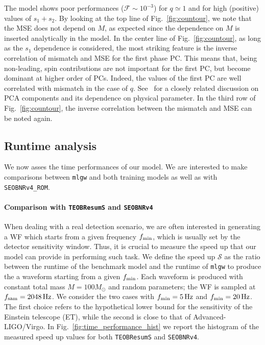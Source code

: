 \documentclass[twocolumn,showpacs,preprintnumbers,nofootinbib,prd,
superscriptaddress,10pt]{revtex4-1}
\begin{document}
The model shows poor performances ($\mathcal{F} \sim 10^{-3}$) for ${q\simeq 1}$ and for high (positive) values of $s_1+s_2$.
By looking at the top line of Fig.~\ref{fig:countour}, we note that the MSE does not depend on $M$,
as expected since the dependence on $M$ is inserted analytically in the model. In the center line of Fig.~\ref{fig:countour}, 
as long as the $s_1$ dependence is considered, the most striking feature is the inverse correlation of mismatch and MSE 
for the first phase PC. This means that, being non-leading, spin contributions are not important for the first PC, 
but become dominant at higher order of PCs. Indeed, the values of the first PC are well correlated with mismatch 
in the case of $q$. See~\cite{Ohme2013PCA_GW} for a closely related discussion on PCA components 
and its dependence on physical parameter.
In the third row of Fig.~\ref{fig:countour}, the inverse correlation between 
the mismatch and MSE can be noted again.
\subsection{Runtime analysis} 
\label{sec:runtime}
We now asses the time performances of our model.
We are interested to make comparisons between
{\tt mlgw} and both training models as well as 
with \texttt{SEOBNRv4\_ROM}.
%
\paragraph{Comparison with \texttt{TEOBResumS} and \texttt{SEOBNRv4}}
When dealing with a real detection scenario, we are often interested in generating a WF which starts from a given frequency 
$f_{\rm min}$, which is usually set by the detector sensitivity window. Thus, it is crucial to measure the speed up that 
our model can provide in performing such task. We define the speed up $\mathcal{S}$ as the ratio between the runtime 
of the benchmark model and the runtime of \texttt{mlgw} to produce the a waveform starting from a given $f_{\rm min}$. 
Each waveform is produced with constant total mass $M = 100 M_{\odot}$ and random parameters; the WF is sampled 
at $f_{\rm sam} = \SI{2048}{Hz}$. We consider the two cases with $f_{\rm min} = \SI{5}{Hz}$ and $f_{\rm min} = \SI{20}{Hz}$. 
The first choice refers to the hypothetical lower bound for the sensitivity of the Einstein telescope (ET), while the second 
is close to that of Advanced-LIGO/Virgo. In Fig.~\ref{fig:time_performance_hist} we report the histogram of the 
measured speed up values for both \texttt{TEOBResumS} and \texttt{SEOBNRv4}.
  
\end{document}
